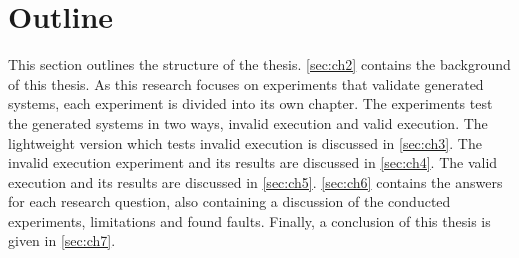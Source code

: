 \section{Outline}
This section outlines the structure of the thesis. \autoref{sec:ch2} contains
the background of this thesis. As this research focuses on experiments that
validate generated systems, each experiment is divided into its own chapter.
The experiments test the generated systems in two ways, invalid execution and
valid execution. The lightweight version which tests invalid execution is
discussed in \autoref{sec:ch3}. The invalid execution experiment and its results
are discussed in \autoref{sec:ch4}. The valid execution and its results are
discussed in \autoref{sec:ch5}. \autoref{sec:ch6} contains the answers for each
research question, also containing a discussion of the conducted experiments,
limitations and found faults. Finally, a conclusion of this thesis is given in
\autoref{sec:ch7}.

